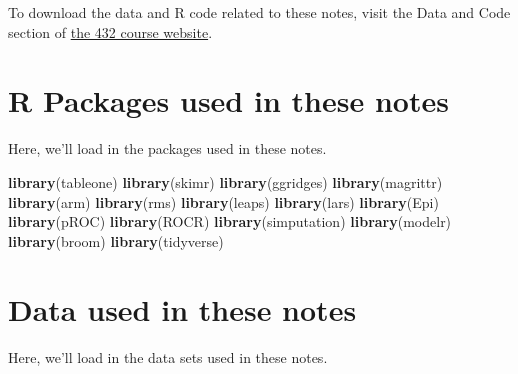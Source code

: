 \documentclass[]{book}
\newenvironment{Shaded}{\begin{snugshade}}{\end{snugshade}}
\newcommand{\KeywordTok}[1]{\textcolor[rgb]{0.13,0.29,0.53}{\textbf{#1}}}
\newcommand{\NormalTok}[1]{#1}
\theoremstyle{definition}
\theoremstyle{definition}
\theoremstyle{definition}
\theoremstyle{remark}
\begin{document}
To download the data and R code related to these notes, visit the Data
and Code section of \href{https://github.com/THOMASELOVE/432-2018}{the
432 course website}.

\chapter*{R Packages used in these
notes}\label{r-packages-used-in-these-notes}

Here, we'll load in the packages used in these notes.

\begin{Shaded}
\begin{Highlighting}[]
\KeywordTok{library}\NormalTok{(tableone)}
\KeywordTok{library}\NormalTok{(skimr)}
\KeywordTok{library}\NormalTok{(ggridges)}
\KeywordTok{library}\NormalTok{(magrittr)}
\KeywordTok{library}\NormalTok{(arm)}
\KeywordTok{library}\NormalTok{(rms)}
\KeywordTok{library}\NormalTok{(leaps)}
\KeywordTok{library}\NormalTok{(lars)}
\KeywordTok{library}\NormalTok{(Epi)}
\KeywordTok{library}\NormalTok{(pROC)}
\KeywordTok{library}\NormalTok{(ROCR)}
\KeywordTok{library}\NormalTok{(simputation)}
\KeywordTok{library}\NormalTok{(modelr)}
\KeywordTok{library}\NormalTok{(broom)}
\KeywordTok{library}\NormalTok{(tidyverse)}
\end{Highlighting}
\end{Shaded}

\chapter*{Data used in these notes}\label{data-used-in-these-notes}

Here, we'll load in the data sets used in these notes.
\end{document}
